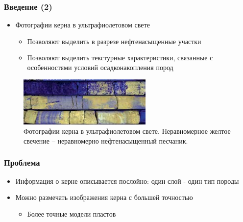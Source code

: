 \documentclass[xetex,mathserif,serif]{beamer}
\begin{document}
	\begin{frame}
		\frametitle{Введение (2)}
		
		\begin{itemize}
	    	\item Фотографии керна в ультрафиолетовом свете
        	    \begin{itemize}
        	    	\item Позволяют выделить в разрезе нефтенасыщенные участки
        	    	\item Позволяют выделить текстурные характеристики, связанные с особенностями условий осадконакопления пород
            	\end{itemize}
        \end{itemize}	
        
        \begin{figure}[h]
            \centering
            \includegraphics[scale=0.6]{images/UV.png}
            \caption{Фотографии керна в ультрафиолетовом свете. Неравномерное желтое свечение – неравномерно нефтенасыщенный песчаник.}
            \label{UV}
        \end{figure}   
        
	\end{frame}	
	
	
	\begin{frame}
		\frametitle{Проблема}
		
		\begin{itemize}
	    	\item Информация о керне описывается послойно: один слой - один тип породы
	    	\item Можно размечать изображения керна с большей точностью 
    		\begin{itemize}
    	    	\item Более точные модели пластов
            \end{itemize} 	    	
        \end{itemize} 
        
	\end{frame}		
	
\end{document}
